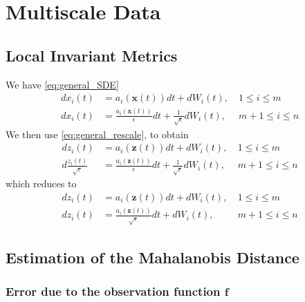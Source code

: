 \chapter{Multiscale Data\label{app:multiscale}}

\graphicspath{{ch-multiscale/figures/}}

\section{Local Invariant Metrics}

We have \eqref{eq:general_SDE}
\begin{equation}
\begin{aligned}
dx_i(t) &= a_i(\mathbf{x}(t)) dt + dW_i(t), & \: 1 \le i \le m \\
dx_i(t) &= \frac{a_i(\mathbf{x}(t))}{\epsilon} dt + \frac{1}{\sqrt{\epsilon}} dW_i(t) , & \: m+1 \le i \le n
\end{aligned}
\end{equation}
%
We then use \eqref{eq:general_rescale}, to obtain
%
\begin{equation}
\begin{aligned}
d z_i(t) &= a_i(\mathbf{z}(t)) dt + dW_i(t), & \: 1 \le i \le m \\
d \frac{z_i(t)}{\sqrt{\epsilon}} &= \frac{a_i(\mathbf{z}(t))}{\epsilon} dt + \frac{1}{\sqrt{\epsilon}} dW_i(t) , & \: m+1 \le i \le n
\end{aligned}
\end{equation}
%
which reduces to
%
\begin{equation}
\begin{aligned}
d z_i(t) &= a_i(\mathbf{z}(t)) dt + dW_i(t), & \: 1 \le i \le m \\
d z_i(t) &= \frac{a_i(\mathbf{z}(t))}{\sqrt{\epsilon}} dt + dW_i(t) , & \: m+1 \le i \le n
\end{aligned}
\end{equation}

\section{Estimation of the Mahalanobis Distance}

\subsection{Error due to the observation function $\mathbf{f}$}

